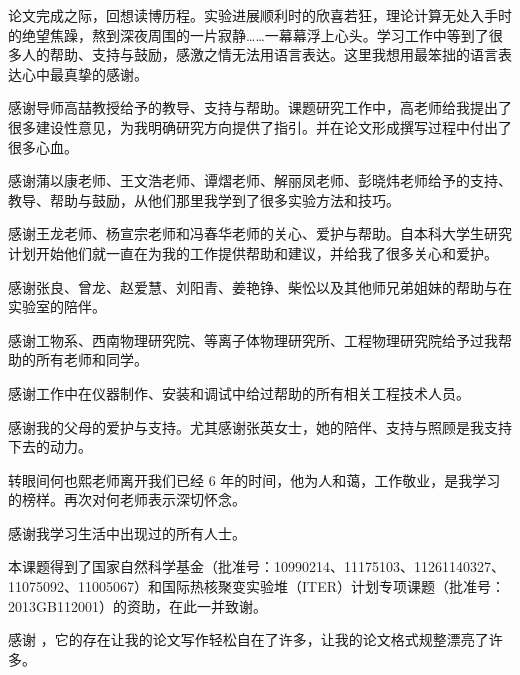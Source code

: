 
\begin{ack}
论文完成之际，回想读博历程。实验进展顺利时的欣喜若狂，理论计算无处入手时的绝望焦躁，熬到深夜周围的一片寂静……一幕幕浮上心头。学习工作中等到了很多人的帮助、支持与鼓励，感激之情无法用语言表达。这里我想用最笨拙的语言表达心中最真挚的感谢。

感谢导师高喆教授给予的教导、支持与帮助。课题研究工作中，高老师给我提出了很多建设性意见，为我明确研究方向提供了指引。并在论文形成撰写过程中付出了很多心血。

感谢蒲以康老师、王文浩老师、谭熠老师、解丽凤老师、彭晓炜老师给予的支持、教导、帮助与鼓励，从他们那里我学到了很多实验方法和技巧。

感谢王龙老师、杨宣宗老师和冯春华老师的关心、爱护与帮助。自本科大学生研究计划开始他们就一直在为我的工作提供帮助和建议，并给我了很多关心和爱护。

感谢张良、曾龙、赵爱慧、刘阳青、姜艳铮、柴忪以及其他师兄弟姐妹的帮助与在实验室的陪伴。

感谢工物系、西南物理研究院、等离子体物理研究所、工程物理研究院给予过我帮助的所有老师和同学。

感谢工作中在仪器制作、安装和调试中给过帮助的所有相关工程技术人员。

感谢我的父母的爱护与支持。尤其感谢张英女士，她的陪伴、支持与照顾是我支持下去的动力。

转眼间何也熙老师离开我们已经 6 年的时间，他为人和蔼，工作敬业，是我学习的榜样。再次对何老师表示深切怀念。

感谢我学习生活中出现过的所有人士。

本课题得到了国家自然科学基金（批准号：10990214、11175103、11261140327、11075092、11005067）和国际热核聚变实验堆（ITER）计划专项课题（批准号：2013GB112001）的资助，在此一并致谢。

感谢 \thuthesis，它的存在让我的论文写作轻松自在了许多，让我的论文格式规整漂亮了许多。
\end{ack}
